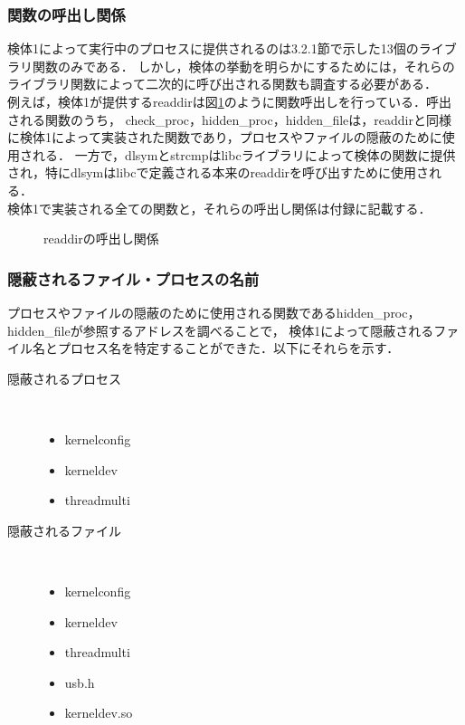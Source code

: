 \documentclass[submit,techreq,noauthor]{eco}	%
\begin{document}
\subsubsection{関数の呼出し関係}
検体1によって実行中のプロセスに提供されるのは3.2.1節で示した13個のライブラリ関数のみである．
しかし，検体の挙動を明らかにするためには，それらのライブラリ関数によって二次的に呼び出される関数も調査する必要がある．\\
\indent
例えば，検体1が提供するreaddirは図\ref{fig:call-graph}のように関数呼出しを行っている．呼出される関数のうち，
check\_proc，hidden\_proc，hidden\_fileは，readdirと同様に検体1によって実装された関数であり，プロセスやファイルの隠蔽のために使用される．
一方で，dlsymとstrcmpはlibcライブラリによって検体の関数に提供され，特にdlsymはlibcで定義される本来のreaddirを呼び出すために使用される．\\
\indent
検体1で実装される全ての関数と，それらの呼出し関係は付録に記載する．

\begin{figure}[H]
	\centering
	\caption{readdirの呼出し関係}
	\label{fig:call-graph}
\end{figure}

\subsubsection{隠蔽されるファイル・プロセスの名前}
プロセスやファイルの隠蔽のために使用される関数であるhidden\_proc，hidden\_fileが参照するアドレスを調べることで，
検体1によって隠蔽されるファイル名とプロセス名を特定することができた．以下にそれらを示す．
\begin{description}
  \item[隠蔽されるプロセス]　
  \begin{itemize}
    \item kernelconfig
    \item kerneldev
    \item threadmulti
  \end{itemize}
  \item[隠蔽されるファイル]　
  \begin{itemize}
    \item kernelconfig
    \item kerneldev
    \item threadmulti
    \item usb.h
    \item kerneldev.so 
  \end{itemize}
\end{description}
\end{document}
